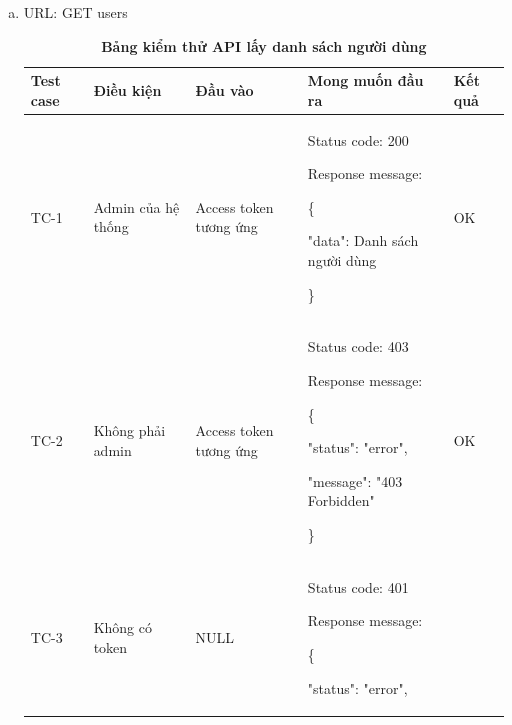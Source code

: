 \begin{enumerate}[a)]
  \item URL: GET users
  
    \begin{xltabular}{\textwidth}{
      | >{\raggedright\arraybackslash}p{1cm}
      | >{\raggedright\arraybackslash}p{2.5cm}
      | >{\raggedright\arraybackslash}p{3.5cm}
      | >{\raggedright\arraybackslash}X
      | >{\raggedright\arraybackslash}p{1cm}|
      }
      \caption{\bfseries \fontsize{12pt}{0pt}\selectfont Bảng kiểm thử API lấy danh sách người dùng}
      \\
      \hline
      \bfseries Test case    &\bfseries Điều kiện   &\bfseries Đầu vào 
      &\bfseries Mong muốn đầu ra &\bfseries Kết quả\\ \hline
    
    
      TC-1
      & Admin của hệ thống
      & Access token tương ứng
    
      & 
    
      Status code: 200
    
        Response message:
    
        \{
    
      "data": Danh sách người dùng
    
      \}
      
      & OK
    
      \\ \hline
    
      TC-2
      & Không phải admin
      & Access token tương ứng
      & 
    
      Status code: 403 
    
        Response message:
    
        \{
    
      "status": "error",
    
      "message": "403 Forbidden"
    
      \}
      
      & OK
    
      \\ \hline


      TC-3
      & Không có token
      & NULL
    
      & 
    
      Status code: 401  
    
        Response message:
    
        \{
    
      "status": "error",
    

\end{xltabular}
\end{enumerate}

